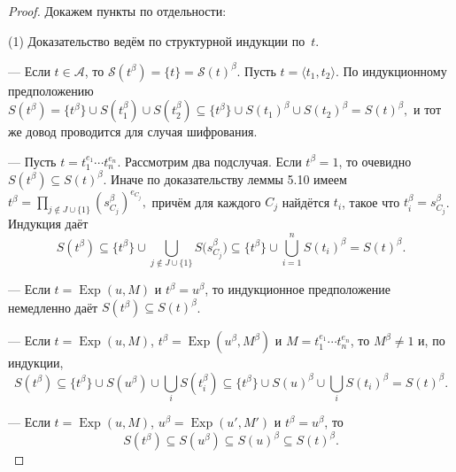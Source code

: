 \begin{proof}
Докажем пункты по отдельности:

(1) Доказательство ведём по структурной индукции по~$t$.

— Если $t\in\mathcal A$, то $\mathcal S(t^{\beta})=\{t\}=\mathcal S(t)^{\beta}$. Пусть $t=\langle t_{1},t_{2}\rangle$. По индукционному предположению
  \(
      S(t^{\beta})
      =\{t^{\beta}\}\cup S(t_{1}^{\beta})\cup S(t_{2}^{\beta})
      \subseteq \{t^{\beta}\}\cup S(t_{1})^{\beta}\cup S(t_{2})^{\beta}
      = S(t)^{\beta},
  \)
  и тот же довод проводится для случая шифрования.

— Пусть $t=t_{1}^{e_{1}}\!\cdots t_{n}^{e_{n}}$.
  Рассмотрим два подслучая. Если $t^{\beta}=1$, то очевидно $S(t^{\beta})\subseteq S(t)^{\beta}$.
  Иначе по доказательству леммы 5.10 имеем
  \(
      t^{\beta}=\prod_{j\notin J\cup\{1\}}
                (s_{C_{j}}^{\beta})^{e_{C_{j}}},
  \)
  причём для каждого $C_{j}$ найдётся $t_{i}$,
  такое что $t_{i}^{\beta}=s_{C_{j}}^{\beta}$.
  Индукция даёт
  \[
    S(t^{\beta})
      \subseteq
      \{t^{\beta}\}\cup
      \bigcup_{j\notin J\cup\{1\}}S\!\bigl(s_{C_{j}}^{\beta}\bigr)
      \subseteq
      \{t^{\beta}\}\cup
      \bigcup_{i=1}^{n}S(t_{i})^{\beta}
      = S(t)^{\beta}.
  \]

— Если $t=\operatorname{Exp}(u,M)$ и $t^{\beta}=u^{\beta}$,
  то индукционное предположение немедленно даёт
  $S(t^{\beta})\subseteq S(t)^{\beta}$.

— Если $t=\operatorname{Exp}(u,M)$, $t^{\beta}=\operatorname{Exp}(u^{\beta},M^{\beta})$
и $M=t_{1}^{e_{1}}\!\cdots t_{n}^{e_{n}}$, то $M^{\beta}\ne1$ и, по индукции,
\[
  S(t^{\beta})
    \subseteq \{t^{\beta}\}\cup S(u^{\beta})\cup\bigcup_{i}S(t_{i}^{\beta})
    \subseteq \{t^{\beta}\}\cup S(u)^{\beta}\cup\bigcup_{i}S(t_{i})^{\beta}
    = S(t)^{\beta}.
\]

— Если $t=\operatorname{Exp}(u,M)$, $u^{\beta}=\operatorname{Exp}(u',M')$ и
  $t^{\beta}=u^{\beta}$, то
  \[
      S(t^{\beta})\subseteq S(u^{\beta})\subseteq S(u)^{\beta} \subseteq S(t)^{\beta}.
  \]


\end{proof}
